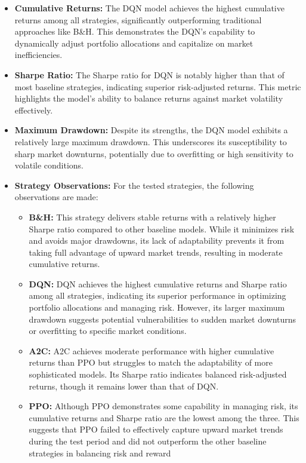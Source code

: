 \documentclass[conference]{IEEEtran}
\begin{document}
\begin{itemize}
  \item \textbf{Cumulative Returns:} The DQN model achieves the highest cumulative returns among all strategies, significantly outperforming traditional approaches like B\&H. This demonstrates the DQN's capability to dynamically adjust portfolio allocations and capitalize on market inefficiencies.
  \item \textbf{Sharpe Ratio:} The Sharpe ratio for DQN is notably higher than that of most baseline strategies, indicating superior risk-adjusted returns. This metric highlights the model's ability to balance returns against market volatility effectively.
  \item \textbf{Maximum Drawdown:} Despite its strengths, the DQN model exhibits a relatively large maximum drawdown. This underscores its susceptibility to sharp market downturns, potentially due to overfitting or high sensitivity to volatile conditions.
  \item \textbf{Strategy Observations:} For the tested strategies, the following observations are made:
    \begin{itemize}
      \item \textbf{B\&H:} This strategy delivers stable returns with a relatively higher Sharpe ratio compared to other baseline models. While it minimizes risk and avoids major drawdowns, its lack of adaptability prevents it from taking full advantage of upward market trends, resulting in moderate cumulative returns.
      \item \textbf{DQN:} DQN achieves the highest cumulative returns and Sharpe ratio among all strategies, indicating its superior performance in optimizing portfolio allocations and managing risk. However, its larger maximum drawdown suggests potential vulnerabilities to sudden market downturns or overfitting to specific market conditions.
      \item \textbf{A2C:} A2C achieves moderate performance with higher cumulative returns than PPO but struggles to match the adaptability of more sophisticated models. Its Sharpe ratio indicates balanced risk-adjusted returns, though it remains lower than that of DQN.
      \item \textbf{PPO:} Although PPO demonstrates some capability in managing risk, its cumulative returns and Sharpe ratio are the lowest among the three. This suggests that PPO failed to effectively capture upward market trends during the test period and did not outperform the other baseline strategies in balancing risk and reward
    \end{itemize}

\end{itemize}
\end{document}
